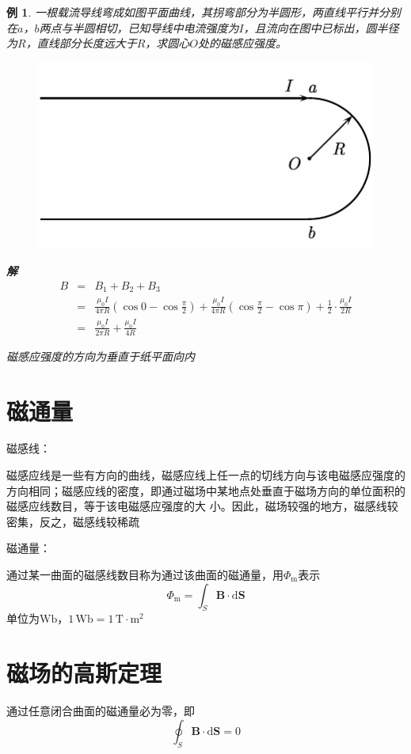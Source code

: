 \documentclass[12pt, a4paper, twoside]{ctexbook}
\newtheorem{example}[theorem]{例}
\begin{document}
\begin{example}
    一根载流导线弯成如图平面曲线，其拐弯部分为半圆形，两直线平行并分别在$a$，$b$两点与半圆相切，已知导线中电流强度为$I$，且流向在图中已标出，圆半径为$R$，直线部分长度远大于$R$，求圆心$O$处的磁感应强度。
    \begin{figure}[H]
        \centerline{\includegraphics[scale=0.88]{CH10EX01.pdf}}
    \end{figure}

    \noindent\textbf{解}
    \begin{eqnarray}
        B &=&B_1+B_2+B_3 \nonumber \\
        ~&=& \frac{\mu_0I}{4\pi R}\left(\cos0-\cos\frac{\pi}{2}\right)+\frac{\mu_0I}{4\pi R}\left(\cos\frac{\pi}{2}-\cos\pi\right)+\frac{1}{2}\cdot\frac{\mu_0I}{2R} \nonumber \\
        ~&=&\frac{\mu_0I}{2\pi R}+\frac{\mu_0I}{4R} \nonumber
    \end{eqnarray}

    磁感应强度的方向为垂直于纸平面向内
\end{example}
\section{磁通量}
{\sonti 磁感线}：

磁感应线是一些有方向的曲线，磁感应线上任一点的切线方向与该电磁感应强度的方向相同；磁感应线的密度，即通过磁场中某地点处垂直于磁场方向的单位面积的磁感应线数目，等于该电磁感应强度的大
小。因此，磁场较强的地方，磁感线较密集，反之，磁感线较稀疏

{\sonti 磁通量}：

通过某一曲面的磁感线数目称为通过该曲面的磁通量，用$\varPhi_\mathrm{m}$表示
$$
\varPhi_\mathrm{m}=\int_S \boldsymbol{B}\cdot\mathrm{d}\boldsymbol{S}
$$
单位为$\mathrm{Wb}$，$1\,\mathrm{Wb}=1\,\mathrm{T}\cdot\mathrm{m}^2$
\section{磁场的高斯定理}
通过任意闭合曲面的磁通量必为零，即
$$
\oint_S\boldsymbol{B}\cdot\mathrm{d}\boldsymbol{S}=0
$$
\end{document}
